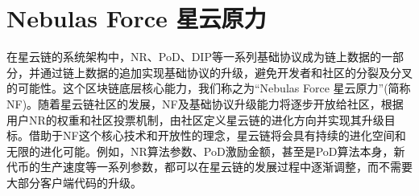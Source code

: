 \section{Nebulas Force 星云原力}
\label{sec:nebulasforce}

在星云链的系统架构中，NR、PoD、DIP等一系列基础协议成为链上数据的一部分，并通过链上数据的追加实现基础协议的升级，避免开发者和社区的分裂及分叉的可能性。这个区块链底层核心能力，我们称之为“Nebulas Force 星云原力”(简称NF)。随着星云链社区的发展，NF及基础协议升级能力将逐步开放给社区，根据用户NR的权重和社区投票机制，由社区定义星云链的进化方向并实现其升级目标。借助于NF这个核心技术和开放性的理念，星云链将会具有持续的进化空间和无限的进化可能。例如，NR算法参数、PoD激励金额，甚至是PoD算法本身，新代币的生产速度等一系列参数，都可以在星云链的发展过程中逐渐调整，而不需要大部分客户端代码的升级。


